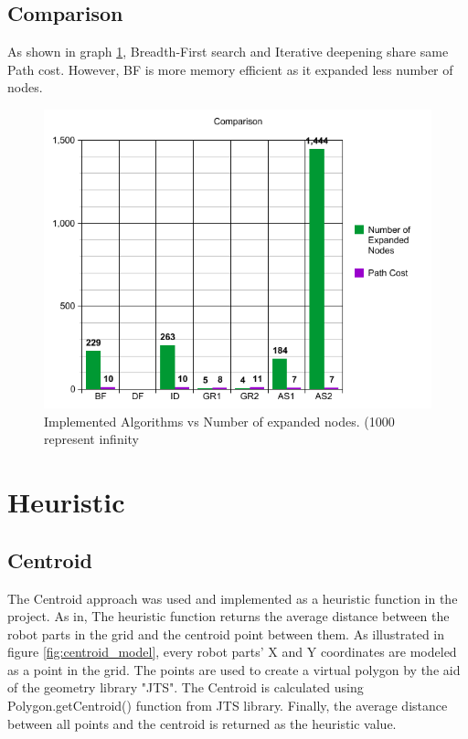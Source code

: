 \section{Comparison}

As shown in graph \ref{fig:graph}, Breadth-First search and Iterative deepening share same Path cost. However, BF is more memory efficient as it expanded less number of nodes. 

\begin{figure}[H] 
   	\centering
	\includegraphics[scale=0.8]{images/Graph} 
    \caption{Implemented Algorithms vs Number of expanded nodes. (1000 represent infinity}
    \label{fig:graph} 
\end{figure}




\chapter{Heuristic}
\section{Centroid}

The Centroid approach was used and implemented as a heuristic function in the project. As in, The heuristic function returns the average distance between the robot parts in the grid and the centroid point between them. As illustrated in figure \ref{fig:centroid_model}, every robot parts' X and Y coordinates are modeled as a point in the grid. The points are used to create a virtual polygon by the aid of the geometry library "JTS". The Centroid is calculated using Polygon.getCentroid() function from JTS library. Finally, the average distance between all points and the centroid is returned as the heuristic value.

